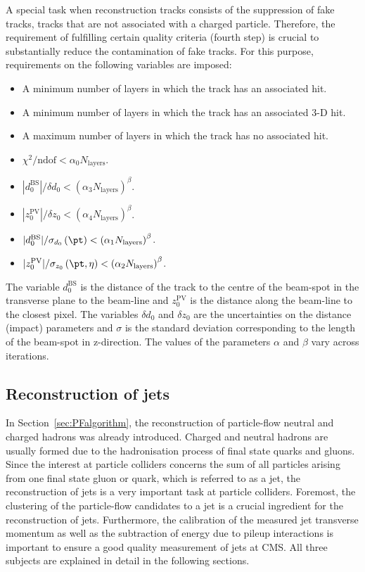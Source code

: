 A special task when reconstruction tracks consists of the suppression of fake tracks, \ie tracks that are not associated with a charged particle.
Therefore, the requirement of fulfilling certain quality criteria (fourth step) is crucial to substantially reduce the contamination of fake tracks.
 For this purpose, requirements on the following variables are imposed:
\begin{itemize}
\item A minimum number of layers in which the track has an associated hit.
\item A minimum number of layers in which the track has an associated 3-D hit.
\item A maximum number of layers in which the track has no associated hit.
\item $\chi^2/\text{ndof} < \alpha_0 N_{\text{layers}}$.
\item $|d_0^{\text{BS}}|/\delta d_0 < \left( \alpha_3 N_{\text{layers}} \right)^{\beta}$.
\item $|z_0^{\text{PV}}|/\delta z_0 < \left( \alpha_4 N_{\text{layers}} \right)^{\beta}$.
\item $|d_0^{\text{BS}}|/\sigma_{d_0} \left(\pt\right) < \left( \alpha_1 N_{\text{layers}} \right)^{\beta}$.
\item $|z_0^{\text{PV}}|/\sigma_{z_0} \left(\pt,\eta\right) < \left( \alpha_2 N_{\text{layers}} \right)^{\beta}$.
\end{itemize}
The variable $d_0^{\text{BS}}$ is the distance of the track to the centre of the beam-spot in the transverse plane to the beam-line and $z_0^{\text{PV}}$ is the distance along the beam-line to the closest pixel.
The variables $\delta d_0$ and $\delta z_0$ are the uncertainties on the distance (impact) parameters and $\sigma$ is the standard deviation corresponding to the length of the beam-spot in z-direction.
The values of the parameters $\alpha$ and $\beta$ vary across iterations.

\subsection{Reconstruction of jets} 
\label{sec:JetReconstruction}
In Section~\ref{sec:PFalgorithm}, the reconstruction of particle-flow neutral and charged hadrons was already introduced.
Charged and neutral hadrons are usually formed due to the hadronisation process of final state quarks and gluons.
Since the interest at particle colliders concerns the sum of all particles arising from one final state gluon or quark, which is referred to as a jet, the reconstruction of jets is a very important task at particle colliders.
Foremost, the clustering of the particle-flow candidates to a jet is a crucial ingredient for the reconstruction of jets.
Furthermore, the calibration of the measured jet transverse momentum as well as the subtraction of energy due to pileup interactions is important to ensure a good quality \pt measurement of jets at CMS.
All three subjects are explained in detail in the following sections.
